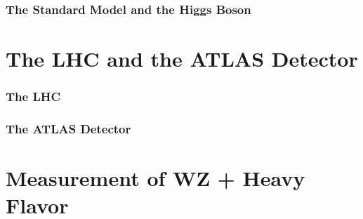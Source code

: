 \documentclass[12pt]{report}	%
\theoremstyle{definition}
\theoremstyle{remark}
\begin{document}

\section{The Standard Model and the Higgs Boson}
\label{sec:sm}



%



\part{The LHC and the ATLAS Detector}
\label{part:lhcAtlas}


\section{The LHC}
\label{sec:lhc}



\section{The ATLAS Detector}
\label{sec:atlas}


 
\part{Measurement of WZ + Heavy Flavor}                                                                                    
\label{part:wz}
\end{document}
